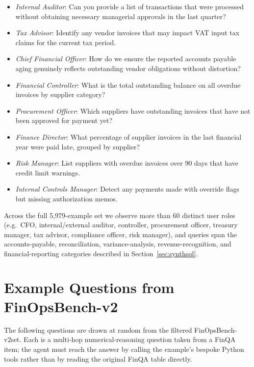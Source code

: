 \documentclass[11pt]{article}
\newcommand{\groundedfinqa}{FinOpsBench-v2}\xspace
\begin{document}
\begin{itemize}
    \item \emph{Internal Auditor}: Can you provide a list of transactions that were processed without obtaining necessary managerial approvals in the last quarter?
    \item \emph{Tax Advisor}: Identify any vendor invoices that may impact VAT input tax claims for the current tax period.
    \item \emph{Chief Financial Officer}: How do we ensure the reported accounts payable aging genuinely reflects outstanding vendor obligations without distortion?
    \item \emph{Financial Controller}: What is the total outstanding balance on all overdue invoices by supplier category?
    \item \emph{Procurement Officer}: Which suppliers have outstanding invoices that have not been approved for payment yet?
    \item \emph{Finance Director}: What percentage of supplier invoices in the last financial year were paid late, grouped by supplier?
    \item \emph{Risk Manager}: List suppliers with overdue invoices over 90 days that have credit limit warnings.
    \item \emph{Internal Controls Manager}: Detect any payments made with override flags but missing authorization memos.
\end{itemize}

Across the full 5{,}979-example set we observe more than 60 distinct user roles (e.g.\ CFO, internal/external auditor, controller, procurement officer, treasury manager, tax advisor, compliance officer, risk manager), and queries span the accounts-payable, reconciliation, variance-analysis, revenue-recognition, and financial-reporting categories described in Section~\ref{sec:synthsql}.

\section{Example Questions from \groundedfinqa}
\label{app:example_queries_v2}

The following questions are drawn at random from the filtered \groundedfinqa set. Each is a multi-hop numerical-reasoning question taken from a FinQA item; the agent must reach the answer by calling the example's bespoke Python tools rather than by reading the original FinQA table directly.
\end{document}
